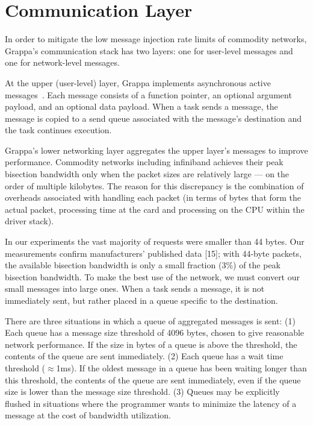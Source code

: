 \section{Communication Layer}
\label{sec:communication}

In order to mitigate the low message injection rate limits of commodity
networks, Grappa's communication stack has two layers: one for user-level
messages and one for network-level messages.

At the upper (user-level) layer, Grappa implements asynchronous active
messages~\cite{vonEicken92}. Each message consists of a function pointer, an
optional argument payload, and an optional data payload. When a task sends a
message, the message is copied to a send queue associated with the message's
destination and the task continues execution.

Grappa’s lower networking layer aggregates the upper layer’s messages to
improve performance. Commodity networks including infiniband achieves their
peak bisection bandwidth only when the packet sizes are relatively large ---
on the order of multiple kilobytes. The reason for this discrepancy is the
combination of overheads associated with handling each packet (in terms of
bytes that form the actual packet, processing time at the card and processing
on the CPU within the driver stack).

In our experiments the vast majority of requests were smaller than 44 bytes.
Our measurements confirm manufacturers' published data [15]; with 44-byte
packets, the available bisection bandwidth is only a small fraction (3\%) of
the peak bisection bandwidth. To make the best use of the network, we must
convert our small messages into large ones. When a task sends a message, it is
not immediately sent, but rather placed in a queue specific to the
destination.

There are three situations in which a queue of aggregated messages is sent:
(1) Each queue has a message size threshold of 4096 bytes, chosen to give
reasonable network performance. If the size in bytes of a queue is above the
threshold, the contents of the queue are sent immediately. (2) Each queue
has a wait time threshold ($\approx${1ms}). If the oldest message in a queue
has been waiting longer than this threshold, the contents of the queue are
sent immediately, even if the queue size is lower than the message size
threshold. (3) Queues may be explicitly flushed in situations where the
programmer wants to minimize the latency of a message at the cost of bandwidth
utilization.

